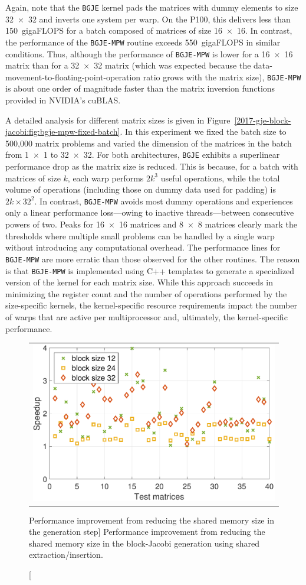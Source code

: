 Again, note that the {\tt BGJE} kernel pads the matrices with dummy
elements to size 32~$\times$~32 and inverts one system per warp. On the P100, this
delivers less than 150~gigaFLOPS for a batch composed of matrices of size 16~$\times$~16. 
In contrast, the performance of the {\tt BGJE-MPW} routine exceeds 550~gigaFLOPS in similar conditions.
Thus, although the performance of {\tt BGJE-MPW} is lower for a 16~$\times$~16 matrix
than for a 32~$\times$~32 matrix (which was expected because the
data-movement-to-floating-point-operation ratio grows with the matrix
size), {\tt BGJE-MPW} is about one order of magnitude faster than the matrix
inversion functions provided in NVIDIA's cuBLAS.

A detailed analysis for different matrix sizes is given in
Figure~\ref{2017-gje-block-jacobi:fig:bgje-mpw-fixed-batch}. In this experiment we fixed the batch
size to 500,000 matrix problems and varied the dimension of the matrices in the
batch from 1~$\times$~1 to 32~$\times$~32. For both architectures, {\tt BGJE} exhibits a superlinear
performance drop as the matrix size is reduced. This is because,
for a batch with matrices of size $k$, each warp performs $2k^3$ useful
operations, while the total volume of operations (including those on dummy data
used for padding) is $2k \times 32^2$. In contrast, {\tt BGJE-MPW} avoids most
dummy operations and experiences only a linear performance loss---owing to
inactive threads---between consecutive powers of two. Peaks for 16~$\times$~16 matrices and
8~$\times$~8 matrices clearly mark the thresholds where multiple small problems can be handled by a
single warp without introducing any computational overhead. The performance
lines for {\tt BGJE-MPW} are more erratic than those observed for the other
routines. The reason is that {\tt BGJE-MPW} is implemented using C++ templates
to generate a specialized version of the kernel for each matrix size. While this
approach succeeds in minimizing the register count and the number of operations
performed by the size-specific kernels, the kernel-specific resource
requirements impact the number of warps that are active per multiprocessor and,
ultimately, the kernel-specific performance.

\begin{figure}[t]
\begin{center}
{\scriptsize
\begin{tabular}{c}
\includegraphics[width=.48\columnwidth]{plots/shared_mem_improvement.pdf}
\end{tabular}
}
\end{center}
\caption
[Performance improvement from reducing the shared memory size in the generation
step]
{Performance improvement from reducing the shared memory size in the 
block-Jacobi generation using shared extraction/insertion.
}
\label{2017-gje-block-jacobi:fig:reducedshared}
\end{figure}
